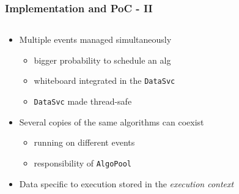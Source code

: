 \documentclass[10pt]{beamer}
\begin{document}
\begin{frame}
\frametitle{Implementation and PoC - II}
\label{sec-1-10}


  \begin{columns}
    \begin{column}{0.7\textwidth}

      \begin{block}{}
        \begin{itemize}
          \item Multiple events managed simultaneously
          \begin{itemize}
             \item bigger probability to schedule an alg
             \item whiteboard integrated in the \texttt{DataSvc}
             \item \texttt{DataSvc} made thread-safe
          \end{itemize}
          \item Several copies of the same algorithms can coexist
          \begin{itemize}
             \item running on different events
             \item responsibility of \texttt{AlgoPool}
          \end{itemize}
          \item Data specific to execution stored in the \emph{execution context}
        \end{itemize}
      \end{block}


\end{column}
\end{columns}
\end{frame}
\end{document}
